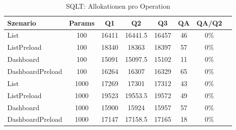 \begin{table}[ht]
\centering
\caption{SQLT: Allokationen pro Operation}
\begin{tabular}{lccccccc}
\toprule
Szenario & Params & Q1 & Q2 & Q3 & QA & QA/Q2 \\
\midrule
	List & 100 & 16411 & 16441.5 & 16457 & 46 & 0\% \\
	ListPreload & 100 & 18340 & 18363 & 18397 & 57 & 0\% \\
	Dashboard & 100 & 15091 & 15097.5 & 15102 & 11 & 0\% \\
	DashboardPreload & 100 & 16264 & 16307 & 16329 & 65 & 0\% \\
	List & 1000 & 17269 & 17301 & 17312 & 43 & 0\% \\
	ListPreload & 1000 & 19523 & 19553.5 & 19572 & 49 & 0\% \\
	Dashboard & 1000 & 15900 & 15924 & 15957 & 57 & 0\% \\
	DashboardPreload & 1000 & 17147 & 17158.5 & 17165 & 18 & 0\% \\
\bottomrule
\end{tabular}
\label{tab:benchmark_sqlt_allocsperop}
\end{table}
	
